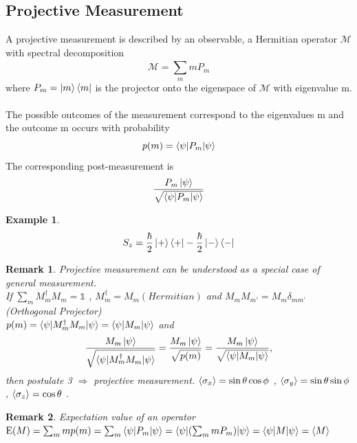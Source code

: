 \documentclass[]{book}
\newtheorem*{remark}{Remark}
\newtheorem*{example}{Example}
\theoremstyle{nonumberplain}
\begin{document}
\subsection{Projective Measurement}
\begin{postu}
A projective measurement is described by an observable, a Hermitian operator $\mathcal{M}$ with spectral decomposition
\[
\mathcal{M}= \sum^{}_{m} m P_{m}
\] 
where $P_{m}=\ket{m}\bra{m}$ is the projector onto the eigenspace of $\mathcal{M}$ with eigenvalue m. \\ \\
The possible outcomes of the measurement correspond to the eigenvalues m and the outcome m occurs with probability
\[
	p(m)=\braket{\psi|P_{m}|\psi}
\] 
The corresponding post-measurement is 
\[
	\frac{P_{m}\ket{\psi}}{\sqrt{\braket{\psi|P_{m}|\psi}}}
\] 
\end{postu}
\begin{example}
\[
S_{z}=
\frac{\hbar}{2}\ket{+}\bra{+} - \frac{\hbar}{2}\ket{-}\bra{-} 
\] 
\end{example}
\begin{remark}
Projective measurement can be understood as a special case of general  measurement. \\ If $\sum^{}_{m}  M^{\dagger}_{m}M_{m}=\mathbb{1} $ , $ M_{m}^{\dagger}=M_{m} (Hermitian)$ and $M_{m}M_{m'}=M_{m}\delta_{mm'}$ (Orthogonal Projector) \\  $p(m) = \braket{\psi|M^{\dagger}_{m}M_{m}|\psi}=\braket{\psi|M_{m}|\psi}$ and 
\[
\frac{M_{m}\ket{\psi}}{\sqrt{\braket{\psi|M^{\dagger}_{m}M_{m}|\psi}}}=\frac{M_{m}\ket{\psi}}{\sqrt{p(m)}}=\frac{M_{m}\ket{\psi}}{\sqrt{\braket{\psi|M_{m}|\psi}}} ,
\]
then postulate 3 $\Rightarrow$ projective measurement. $\braket{\sigma_{x}}=\sin{\theta}\cos{\phi}$ , $\braket{\sigma_{y}}=\sin{\theta}\sin{\phi}$ , $\braket{\sigma_{z}}=\cos{\theta}$ .
\end{remark}
\begin{remark}
    Expectation value of an operator $\textbf{\rm{E}}(M) = \sum_{m}m p(m)= \sum_m\braket{\psi|P_{m}|\psi}=\braket{\psi|(\sum_{m}mP_{m})|\psi}=\braket{\psi|M|\psi}=\braket{M} $
\end{remark}
\end{document}
